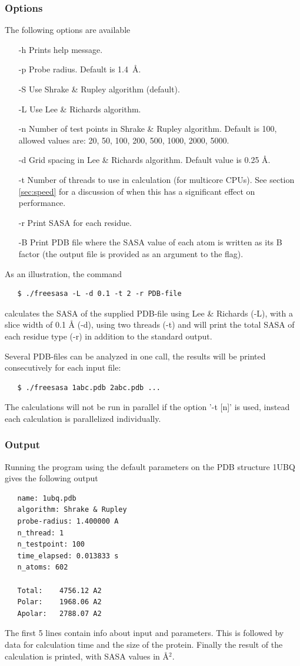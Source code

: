 \documentclass[a4paper,11pt]{article}
\begin{document}
\subsubsection{Options}
The following options are available
\begin{itemize}
  \item[-h] Prints help message.
  \item[-p] Probe radius. Default is 1.4~\AA.
  \item[-S] Use Shrake \& Rupley algorithm (default).
  \item[-L] Use Lee \& Richards algorithm.
  \item[-n] Number of test points in Shrake \& Rupley algorithm.
    Default is 100, allowed values are: 20, 50, 100, 200, 500, 1000,
    2000, 5000.
  \item[-d] Grid spacing in Lee \& Richards algorithm.
  Default value is 0.25 Å.
  \item[-t] Number of threads to use in calculation (for multicore
    CPUs). See section \ref{sec:speed} for a discussion of when this
    has a significant effect on performance.
  \item[-r] Print SASA for each residue.
  \item[-B] Print PDB file where the SASA value of each atom is
    written as its B factor (the output file is provided as an
    argument to the flag).
\end{itemize}
As an illustration, the command
\begin{verbatim}
   $ ./freesasa -L -d 0.1 -t 2 -r PDB-file
\end{verbatim}
calculates the SASA of the supplied PDB-file using Lee \& Richards (-L),
with a slice width of 0.1 Å (-d), using two threads (-t) and will print the
total SASA of each residue type (-r) in addition to the standard output.

Several PDB-files can be analyzed in one call, the results will be
printed consecutively for each input file:
\begin{verbatim}
   $ ./freesasa 1abc.pdb 2abc.pdb ...
\end{verbatim}
The calculations will not be run in parallel if the option '-t [n]' is
used, instead each calculation is parallelized individually.

\subsubsection{Output}
Running the program using the default parameters on the PDB structure
1UBQ gives the following output
\begin{verbatim}
   name: 1ubq.pdb
   algorithm: Shrake & Rupley
   probe-radius: 1.400000 A
   n_thread: 1
   n_testpoint: 100
   time_elapsed: 0.013833 s
   n_atoms: 602
   
   Total:    4756.12 A2
   Polar:    1968.06 A2
   Apolar:   2788.07 A2
\end{verbatim}
The first 5 lines contain info about input and parameters. This is
followed by data for calculation time and the size of the
protein. Finally the result of the calculation is printed, with SASA
values in Å$^2$.
\end{document}
